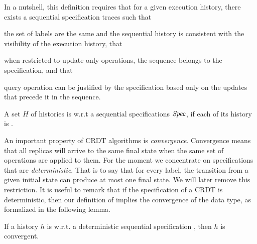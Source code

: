 In a nutshell, this definition requires that for a given execution
history, there exists a sequential specification traces such
that
\begin{inparaenum}
\item the set of labels are the same and the sequential history is
  consistent with the visibility of the execution history, that
\item when restricted to update-only operations, the sequence belongs to
  the specification, and that
\item query operation can be justified by the specification based only
  on the updates that precede it in the sequence.
\end{inparaenum}


A set $H$ of histories is \crdtlinearizable{} w.r.t
a sequential specifications $\mathit{Spec}$, if each of its history is
\crdtlinearizable{}.
%

An important property of CRDT algorithms is \emph{convergence}.
Convergence means that all replicas will arrive to the same final
state when the same set of operations are applied to them.
For the moment we concentrate on specifications that are
\emph{deterministic}.
That is to say that for every label, the transition from a given
initial state can produce at most one final state.
We will later remove this restriction.
It is useful to remark that if the specification of a CRDT is
deterministic, then our definition of \crdtlin{} implies the
convergence of the data type, as formalized in the following lemma.

\begin{lemma}
\label{lemma:distributed linarizability implies convergence}
If a history $h$ is \crdtlinearizable{} w.r.t. a deterministic
sequential specification \Spec, then $h$ is convergent.
\end{lemma}
